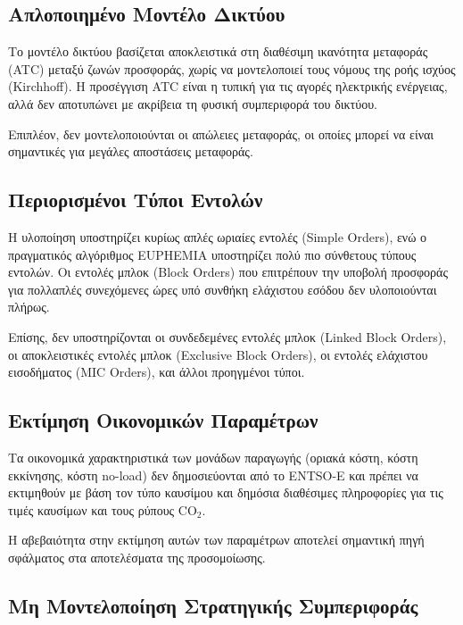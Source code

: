 \subsection{Απλοποιημένο Μοντέλο Δικτύου}
\label{subsec:network-limitation}

Το μοντέλο δικτύου βασίζεται αποκλειστικά στη διαθέσιμη ικανότητα μεταφοράς (ATC) μεταξύ ζωνών προσφοράς, χωρίς να μοντελοποιεί τους νόμους της ροής ισχύος (Kirchhoff). Η προσέγγιση ATC είναι η τυπική για τις αγορές ηλεκτρικής ενέργειας, αλλά δεν αποτυπώνει με ακρίβεια τη φυσική συμπεριφορά του δικτύου.

Επιπλέον, δεν μοντελοποιούνται οι απώλειες μεταφοράς, οι οποίες μπορεί να είναι σημαντικές για μεγάλες αποστάσεις μεταφοράς.

\subsection{Περιορισμένοι Τύποι Εντολών}
\label{subsec:order-types-limitation}

Η υλοποίηση υποστηρίζει κυρίως απλές ωριαίες εντολές (Simple Orders), ενώ ο πραγματικός αλγόριθμος EUPHEMIA υποστηρίζει πολύ πιο σύνθετους τύπους εντολών. Οι εντολές μπλοκ (Block Orders) που επιτρέπουν την υποβολή προσφοράς για πολλαπλές συνεχόμενες ώρες υπό συνθήκη ελάχιστου εσόδου δεν υλοποιούνται πλήρως.

Επίσης, δεν υποστηρίζονται οι συνδεδεμένες εντολές μπλοκ (Linked Block Orders), οι αποκλειστικές εντολές μπλοκ (Exclusive Block Orders), οι εντολές ελάχιστου εισοδήματος (MIC Orders), και άλλοι προηγμένοι τύποι.

\subsection{Εκτίμηση Οικονομικών Παραμέτρων}
\label{subsec:economic-parameters-limitation}

Τα οικονομικά χαρακτηριστικά των μονάδων παραγωγής (οριακά κόστη, κόστη εκκίνησης, κόστη no-load) δεν δημοσιεύονται από το ENTSO-E και πρέπει να εκτιμηθούν με βάση τον τύπο καυσίμου και δημόσια διαθέσιμες πληροφορίες για τις τιμές καυσίμων και τους ρύπους CO$_2$.

Η αβεβαιότητα στην εκτίμηση αυτών των παραμέτρων αποτελεί σημαντική πηγή σφάλματος στα αποτελέσματα της προσομοίωσης.

\subsection{Μη Μοντελοποίηση Στρατηγικής Συμπεριφοράς}
\label{subsec:strategic-behavior-limitation}

